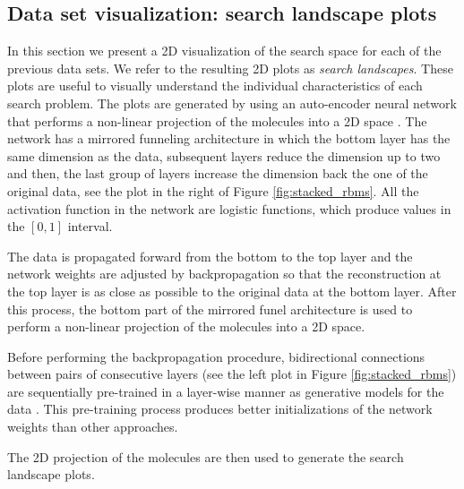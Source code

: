 \subsection{Data set visualization: search landscape plots}

In this section we present a 2D visualization of the search space for each of
the previous data sets. We refer to the resulting 2D plots as \emph{search
landscapes}. These plots are useful to visually understand the individual
characteristics of each search problem. The plots are generated by using an
auto-encoder neural network that performs a non-linear projection of the
molecules into a 2D space \cite{Hinton_2006}. The network has a mirrored
funneling architecture in which the bottom layer has the same dimension as the
data, subsequent layers reduce the dimension up to two and then, the last group
of layers increase the dimension back the one of the original data, see the
plot in the right of Figure \ref{fig:stacked_rbms}.  All the activation
function in the network are logistic functions, which produce values in the
$[0,1]$ interval.

The data is propagated forward from the bottom to the top layer and the network
weights are adjusted by backpropagation so that the reconstruction at the top
layer is as close as possible to the original data at the bottom layer. After
this process, the bottom part of the mirrored funel architecture is used to
perform a non-linear projection of the molecules into a 2D space.

Before performing the
backpropagation procedure, bidirectional connections between pairs of
consecutive layers (see the left plot in Figure \ref{fig:stacked_rbms}) are
sequentially pre-trained in a layer-wise manner as generative models for the
data \cite{Hinton_2006}. This pre-training process produces better
initializations of the network weights than other approaches.

The 2D projection of the molecules are then used to generate the search
landscape plots.


